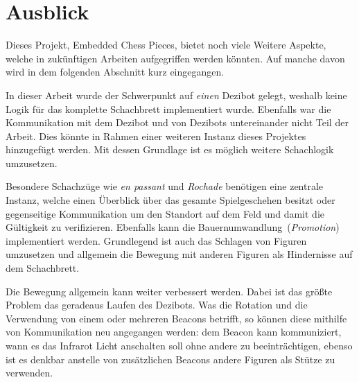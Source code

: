 
\section{Ausblick}
\label{sec:perspective}

Dieses Projekt, Embedded Chess Pieces, bietet noch viele Weitere Aspekte, welche in zukünftigen Arbeiten aufgegriffen werden könnten. Auf manche davon wird in dem folgenden Abschnitt kurz eingegangen.

In dieser Arbeit wurde der Schwerpunkt auf \emph{einen} Dezibot gelegt, weshalb keine Logik für das komplette Schachbrett implementiert wurde. Ebenfalls war die Kommunikation mit dem Dezibot und von Dezibots untereinander nicht Teil der Arbeit. Dies könnte in Rahmen einer weiteren Instanz dieses Projektes hinzugefügt werden. Mit dessen Grundlage ist es möglich weitere Schachlogik umzusetzen.

Besondere Schachzüge wie \emph{en passant} und \emph{Rochade} benötigen eine zentrale Instanz, welche einen Überblick über das gesamte Spielgeschehen besitzt oder gegenseitige Kommunikation um den Standort auf dem Feld und damit die Gültigkeit zu verifizieren. Ebenfalls kann die Bauernumwandlung~(\emph{Promotion}) implementiert werden. Grundlegend ist auch das Schlagen von Figuren umzusetzen und allgemein die Bewegung mit anderen Figuren als Hindernisse auf dem Schachbrett.

Die Bewegung allgemein kann weiter verbessert werden. Dabei ist das größte Problem das geradeaus Laufen des Dezibots. Was die Rotation und die Verwendung von einem oder mehreren Beacons betrifft, so können diese mithilfe von Kommunikation neu angegangen werden: dem Beacon kann kommuniziert, wann es das Infrarot Licht anschalten soll ohne andere zu beeinträchtigen, ebenso ist es denkbar anstelle von zusätzlichen Beacons andere Figuren als Stütze zu verwenden. 
